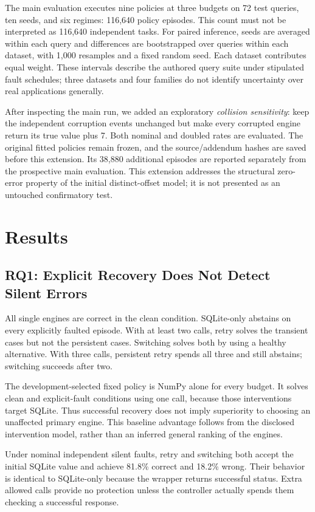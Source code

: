 \documentclass{svproc}
\begin{document}
The main evaluation executes nine policies at three budgets on 72 test queries, ten seeds, and six regimes: 116,640 policy episodes. This count must not be interpreted as 116,640 independent tasks. For paired inference, seeds are averaged within each query and differences are bootstrapped over queries within each dataset, with 1,000 resamples and a fixed random seed. Each dataset contributes equal weight. These intervals describe the authored query suite under stipulated fault schedules; three datasets and four families do not identify uncertainty over real applications generally.

After inspecting the main run, we added an exploratory \emph{collision sensitivity}: keep the independent corruption events unchanged but make every corrupted engine return its true value plus 7. Both nominal and doubled rates are evaluated. The original fitted policies remain frozen, and the source/addendum hashes are saved before this extension. Its 38,880 additional episodes are reported separately from the prospective main evaluation. This extension addresses the structural zero-error property of the initial distinct-offset model; it is not presented as an untouched confirmatory test.

\section{Results}
\subsection{RQ1: Explicit Recovery Does Not Detect Silent Errors}
All single engines are correct in the clean condition. SQLite-only abstains on every explicitly faulted episode. With at least two calls, retry solves the transient cases but not the persistent cases. Switching solves both by using a healthy alternative. With three calls, persistent retry spends all three and still abstains; switching succeeds after two.

The development-selected fixed policy is NumPy alone for every budget. It solves clean and explicit-fault conditions using one call, because those interventions target SQLite. Thus successful recovery does not imply superiority to choosing an unaffected primary engine. This baseline advantage follows from the disclosed intervention model, rather than an inferred general ranking of the engines.

Under nominal independent silent faults, retry and switching both accept the initial SQLite value and achieve 81.8\% correct and 18.2\% wrong. Their behavior is identical to SQLite-only because the wrapper returns successful status. Extra allowed calls provide no protection unless the controller actually spends them checking a successful response.
\end{document}
